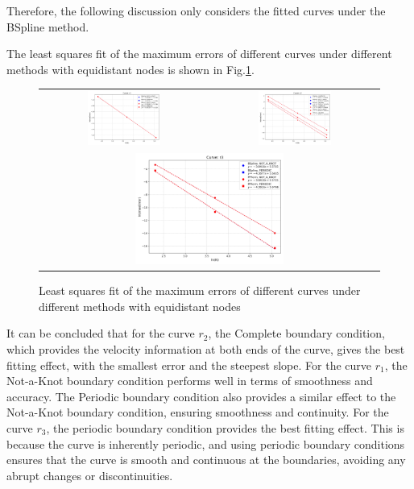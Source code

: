 \documentclass[a4paper]{article}
\begin{document}
\begin{sloppypar}
Therefore, the following discussion only considers the fitted curves under the
BSpline method.

The least squares fit of the maximum errors of different curves under different
methods with equidistant nodes is shown in Fig.\ref{fig:leastSquare_fit}.

\begin{figure}[H]
  \centering
  \begin{tabular}{cc}
    \includegraphics[width=0.45\textwidth]{../figure/problemE/r1_lnMaxError_vs_lnN.png} &
    \includegraphics[width=0.45\textwidth]{../figure/problemE/r2_lnMaxError_vs_lnN.png}   \\
    \multicolumn{2}{c}{\includegraphics[width=0.45\textwidth]{../figure/problemE/r3_lnMaxError_vs_lnN.png}}
  \end{tabular}
  \renewcommand{\figurename}{Fig.}
  \caption{Least squares fit of the maximum errors of different curves under different methods with equidistant nodes}
  \label{fig:leastSquare_fit}
\end{figure}

It can be concluded that for the curve \(r_2\), the Complete boundary
condition, which provides the velocity information at both ends of the curve,
gives the best fitting effect, with the smallest error and the steepest slope.
For the curve \(r_1\), the Not-a-Knot boundary condition performs well in terms
of smoothness and accuracy. The Periodic boundary condition also provides a
similar effect to the Not-a-Knot boundary condition, ensuring smoothness and
continuity. For the curve \(r_3\), the periodic boundary condition provides the
best fitting effect. This is because the curve is inherently periodic, and
using periodic boundary conditions ensures that the curve is smooth and
continuous at the boundaries, avoiding any abrupt changes or discontinuities.


\end{sloppypar}
\end{document}
